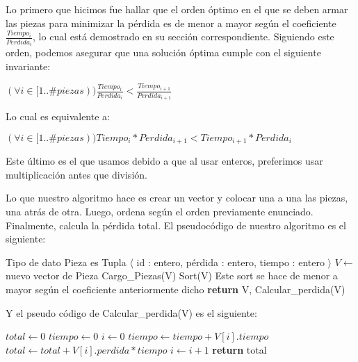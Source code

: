 Lo primero que hicimos fue hallar que el orden óptimo en el que se deben armar las piezas para minimizar la pérdida es de menor a mayor según el coeficiente $\frac{Tiempo_i}{Perdida_i}$, lo cual está demostrado en su sección correspondiente. Siguiendo este orden, podemos asegurar que una solución óptima cumple con el siguiente invariante:

\begin{center}

$(\forall i \in [1..\#{piezas})) \frac{Tiempo_i}{Perdida_i} < \frac{Tiempo_{i+1}}{Perdida_{i+1}}$
 
\end{center}

Lo cual es equivalente a:

\begin{center}

$(\forall i \in [1..\#{piezas})) Tiempo_i * Perdida_{i+1} < Tiempo_{i+1} * Perdida_i$
 
\end{center}

Este último es el que usamos debido a que al usar enteros, preferimos usar multiplicación antes que división.

Lo que nuestro algoritmo hace es crear un vector y colocar una a una las piezas, una atrás de otra. Luego, ordena según el orden previamente enunciado. Finalmente, calcula la pérdida total. El pseudocódigo de nuestro algoritmo es el siguiente:

\renewcommand{\algorithmiccomment}[1]{\hskip2em$//$ #1}

\begin{pseudo}
\State Tipo de dato Pieza es Tupla $\langle$ id : entero, pérdida : entero, tiempo : entero $\rangle$
        \State $V \leftarrow$ nuevo vector de Pieza %
        \State Cargo\_Piezas(V) %
        \State Sort(V) %
        \Comment Este sort se hace de menor a mayor según el coeficiente anteriormente dicho
        \State \textbf{return} V, Calcular\_perdida(V) %
    \EndProcedure
\end{pseudo}

Y el pseudo código de Calcular\_perdida(V) es el siguiente:

\begin{pseudo}
      \State $total \leftarrow 0$
      \State $tiempo \leftarrow 0$
      \State $i \leftarrow 0$
	\State $tiempo \leftarrow tiempo + V[i].tiempo$
	\State $total \leftarrow total + V[i].perdida * tiempo$
	\State $i \leftarrow  i + 1$
      \EndWhile
      \State \textbf{return} total
  \EndProcedure
\end{pseudo}
